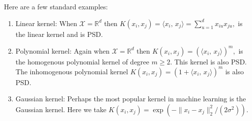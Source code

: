 \documentclass[twoside,12pt]{article}
\newcommand{\inprod}[2]{\ensuremath{\langle #1 , \, #2 \rangle}}
\begin{document}
Here are a few standard examples:
\begin{enumerate}
\item Linear kernel: When $\mathcal{X} = \mathbb{R}^d$ then $K(x_i,x_j) = \inprod{x_i}{x_j} = \sum_{u=1}^d x_{iu} x_{ju},$ is the linear kernel and is PSD.
\item Polynomial kernel: Again when $\mathcal{X} = \mathbb{R}^d$ then $K(x_i,x_j) = (\inprod{x_i}{x_j})^m,$ is the homogenous polynomial kernel of degree $m \geq 2$. This kernel is also PSD. The inhomogenous polynomial kernel $K(x_i,x_j) = (1 + \inprod{x_i}{x_j})^m$ is also PSD.
\item Gaussian kernel: Perhaps the most popular kernel in machine learning is the Gaussian kernel. Here we take $K(x_i,x_j) = \exp(- \|x_i - x_j\|_2^2 / (2\sigma^2)).$
\end{enumerate}

\end{document}

